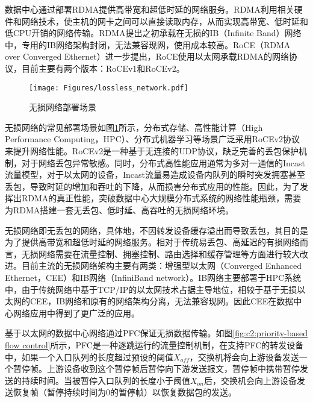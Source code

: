 



数据中心通过部署RDMA提供高带宽和超低时延的网络服务\cite{wang2021datacenter}。RDMA利用相关硬件和网络技术，使主机的网卡之间可以直接读取内存，从而实现高带宽、低时延和低CPU开销的网络传输。RDMA提出之初承载在无损的IB（Infinite Band）网络中，专用的IB网络架构封闭，无法兼容现网，使用成本较高。RoCE（RDMA over Converged Ethernet）进一步提出，RoCE使用以太网承载RDMA的网络协议，目前主要有两个版本：RoCEv1和RoCEv2。

\begin{figure}[H]
  \centering
  \texttt{[image: Figures/lossless\_network.pdf]}
  \caption{无损网络部署场景}
  \label{c4:s1:ss1:lossless network}
\end{figure}

无损网络的常见部署场景如图\ref{c4:s1:ss1:lossless network}所示，分布式存储、高性能计算（High Performance Computing，HPC）、分布式机器学习等场景广泛采用RoCEv2协议来提升网络性能\cite{zhao2021intelligent}。RoCEv2是一种基于无连接的UDP协议，缺乏完善的丢包保护机制，对于网络丢包异常敏感。同时，分布式高性能应用通常为多对一通信的Incast流量模型，对于以太网的设备，Incast流量易造成设备内队列的瞬时突发拥塞甚至丢包，导致时延的增加和吞吐的下降，从而损害分布式应用的性能\cite{calder2011windows,zaharia2012resilient}。因此，为了发挥出RDMA的真正性能，突破数据中心大规模分布式系统的网络性能瓶颈，需要为RDMA搭建一套无丢包、低时延、高吞吐的无损网络环境。

无损网络即无丢包的网络\cite{SIGCOMM15DCQCN,lu2018multi,NSDI20PCN}，具体地，不因转发设备缓存溢出而导致丢包，其目的是为了提供高带宽和超低时延的网络服务。相对于传统易丢包、高延迟的有损网络而言，无损网络需要在流量控制、拥塞控制、路由选择和缓存管理等方面进行较大改进。目前主流的无损网络架构主要有两类：增强型以太网\cite{reinemo2010ethernet}（Converged Enhanced Ethernet，CEE）和IB网络\cite{SIGCOMM15DCQCN,zhu2015packet}（InfiniBand network）。IB网络主要部署于HPC系统中，由于传统网络中基于TCP/IP的以太网技术占据主导地位，相较于基于无损以太网的CEE，IB网络和原有的网络架构分离，无法兼容现网。因此CEE在数据中心网络应用中得到了更广泛的应用。


\label{c2:s4:priority-based flow control}

基于以太网的数据中心网络通过PFC\cite{PFC}保证无损数据传输。如图\ref{fig:c2:priority-based flow control}所示，PFC是一种逐跳运行的流量控制机制，在支持PFC的转发设备中，如果一个入口队列的长度超过预设的阈值$X_{off}$，交换机将会向上游设备发送一个暂停帧。上游设备收到这个暂停帧后暂停向下游发送报文，暂停帧中携带暂停发送的持续时间。当被暂停入口队列的长度小于阈值$X_{on}$后，交换机会向上游设备发送恢复帧（暂停持续时间为0的暂停帧）以恢复数据包的发送。

